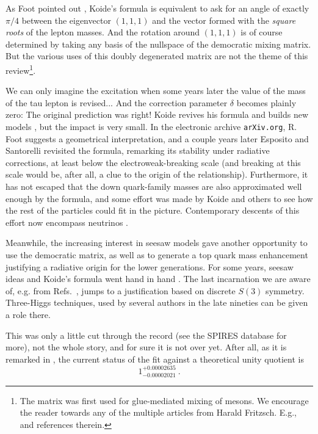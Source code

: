 \documentclass[12pt,a4paper]{article}
\begin{document}
  
   As Foot pointed out \cite{foot}, Koide's formula is equivalent to ask for
an angle of exactly $\pi/4$ between the eigenvector $(1,1,1)$ and the 
vector formed with the \emph{square roots} of the lepton masses. And the rotation 
around $(1,1,1)$ is of course determined by taking any basis of the nullspace 
of the democratic mixing matrix. But the various uses of this doubly
degenerated matrix are not the theme of this review\footnote{The matrix was first 
used for glue-mediated mixing of mesons. We encourage the reader towards any of the multiple articles from Harald Fritzsch. E.g., \cite{hf} and references therein.}.

   We can only imagine the excitation when some years later the value of the
mass of the tau lepton is revised... And the correction parameter $\delta$ 
becomes plainly zero: The original prediction was right! Koide revives
his formula and builds new models \cite{k3,k4}, but the impact is 
very small.  In the electronic archive {\tt arXiv.org}, R. Foot
\cite{foot} suggests a geometrical interpretation, and a couple years
later Esposito and Santorelli \cite{es} revisited the formula, remarking its
stability under radiative corrections, at least below the electroweak-breaking scale (and breaking at this scale would be, after all, a clue to the origin of the relationship).  Furthermore, it has not escaped that the down quark-family masses are also approximated well enough by the formula, and some effort was made by Koide and others to see how the rest of the particles could fit in the picture.  Contemporary descents of this effort now encompass neutrinos \cite{newone}.


Meanwhile, the increasing interest in seesaw models gave another
opportunity to use the democratic matrix, as well as to generate a top quark mass enhancement justifying a radiative origin for the lower generations.
For some years, seesaw ideas and Koide's formula went hand in hand \cite{k5,k6,k7}. The last incarnation we are aware of, e.g. from Refs.~\cite{k7,k8}, jumps to a justification based on discrete $S(3)$ symmetry. Three-Higgs techniques, used  by several authors in
the late nineties \cite{kiselev,adler} can be given a role there. 

This was only a little cut through the record (see the SPIRES database for more), not the whole story, and for sure it is not over yet.  After all, as it is remarked in \cite{newone}, the current status of the fit against a theoretical unity quotient is $$ 1^{+0.00002635}_{-0.00002021} ~.$$ 
\end{document}

